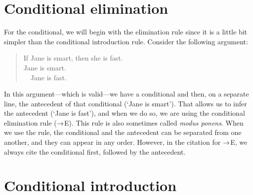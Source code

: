 \section{Conditional elimination}

For the conditional, we will begin with the elimination rule since it is a little bit simpler than the conditional introduction rule. Consider the following argument:
	\begin{quote}
		If Jane is smart, then she is fast.\\
		Jane is smart.\\ 
		\therefore~~Jane is fast.
	\end{quote}
In this argument---which is valid---we have a conditional and then, on a separate line, the antecedent of that conditional (`Jane is smart'). That allows us to infer the antecedent (`Jane is fast'), and when we do so, we are using the conditional elimination rule ($\rightarrow$E).
This rule is also sometimes called \emph{modus ponens}. When we use the rule, the conditional and the antecedent can be separated from one another, and they can appear in any order. However, in the citation for $\rightarrow$E, we always cite the conditional first, followed by the antecedent.


\section{Conditional introduction}

